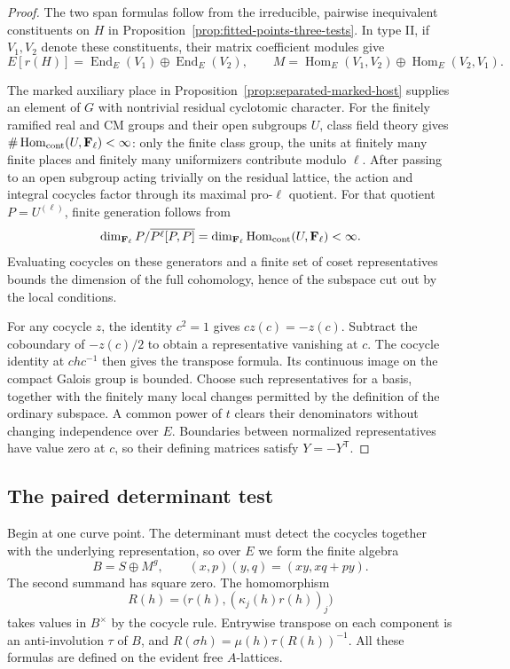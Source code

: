 \begin{proof}
The two span formulas follow from the irreducible, pairwise
inequivalent constituents on \(H\) in
Proposition~\ref{prop:fitted-points-three-tests}. In type II, if \(V_1,V_2\) denote these constituents, their matrix
coefficient modules give
\[
 E[r(H)]=\operatorname{End}_E(V_1)\oplus\operatorname{End}_E(V_2),
 \qquad M=\operatorname{Hom}_E(V_1,V_2)\oplus\operatorname{Hom}_E(V_2,V_1).
\]

The marked
auxiliary place in Proposition~\ref{prop:separated-marked-host}
supplies an element of \(G\) with nontrivial residual cyclotomic
character. For the finitely ramified real and CM groups and their
open subgroups \(U\), class field theory gives
\(\#\operatorname{Hom}_{\rm cont}(U,\mathbf F_\ell)<\infty\):
only the finite class group, the units at finitely many finite
places and finitely many uniformizers contribute modulo \(\ell\).
After passing to an open subgroup acting trivially on the residual
lattice, the action and integral cocycles factor through its
maximal pro-\(\ell\) quotient. 
For that quotient \(P=U^{(\ell)}\), finite generation follows from
\[
      \dim_{\mathbf F_\ell}P/\overline{P^\ell[P,P]}
       =\dim_{\mathbf F_\ell}\operatorname{Hom}_{\rm cont}(U,\mathbf F_\ell)<\infty .
\] Evaluating cocycles on
these generators and a finite set of coset representatives
bounds the dimension of the full cohomology, hence of the
subspace cut out by the local conditions.

For any cocycle \(z\), the identity \(c^2=1\) gives
\(c z(c)=-z(c)\). Subtract the coboundary of \(-z(c)/2\) to
obtain a representative vanishing at \(c\). The cocycle identity
at \(chc^{-1}\) then gives the transpose formula. Its continuous
image on the compact Galois group is bounded. Choose such
representatives for a basis, together with the finitely many
local changes permitted by the definition of the ordinary
subspace. A common power of \(t\) clears their denominators
without changing independence over \(E\). Boundaries between
normalized representatives have value zero at \(c\), so their
defining matrices satisfy \(Y=-Y^{\mathsf T}\).
\end{proof}

\subsection{The paired determinant test}
\label{subsec:det-test}

Begin at one curve point. The determinant must detect the cocycles together with the
underlying representation, so over \(E\) we form the finite algebra
\[
 B=S\oplus M^g,\qquad
 (x,p)(y,q)=(xy,xq+py).
\]
The second summand has square zero. The homomorphism
\[
 R(h)=\bigl(r(h),(\kappa_j(h)r(h))_j\bigr)
\]
takes values in \(B^\times\) by the cocycle rule. Entrywise transpose
on each component is an anti-involution \(\tau\) of \(B\), and
\(R(\sigma h)=\mu(h)\tau(R(h))^{-1}\). All these formulas are defined
on the evident free \(A\)-lattices.

